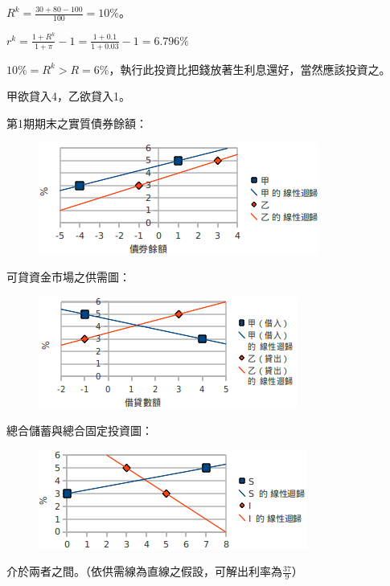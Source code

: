 \documentclass[12pt]{article}
\begin{document}
\begin{CJK}{UTF8}{cwmb}
\begin{num}
\item 
	\begin{num}
		\item $R^k=\frac{30+80-100}{100}=10\%$。
		\item $r^k=\frac{1+R^k}{1+\pi}-1=\frac{1+0.1}{1+0.03}-1=6.796\%$
		\item $10\%=R^k > R=6\%$，執行此投資比把錢放著生利息還好，當然應該投資之。
	\end{num}
\item 
	\begin{num}
		\item 甲欲貸入4，乙欲貸入1。
		\item 第1期期末之實質債券餘額：
\begin{figure}[htp]
\centering
\includegraphics[scale=0.6]{2b.png}
\end{figure}
		\item 可貸資金市場之供需圖：
\begin{figure}[htp]
\centering
\includegraphics[scale=0.6]{2c.png}
\end{figure}
		\item 總合儲蓄與總合固定投資圖：
\begin{figure}[htp]
\centering
\includegraphics[scale=0.6]{2d.png}
\end{figure}
		\item 介於兩者之間。（依供需線為直線之假設，可解出利率為$\frac{37}{9}$）

\end{num}
\end{num}
\end{CJK}
\end{document}
